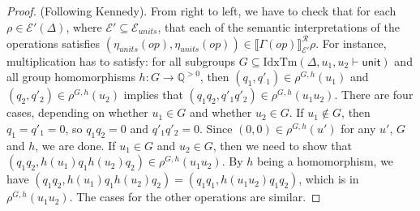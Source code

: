 \documentclass[natbib,preprint]{sigplanconf}
\newcommand{\idxTms}[2]{\mathrm{IdxTm}(#1 \vdash #2)}
\newcommand{\relEnv}[1]{\mathcal{#1}}
\newcommand{\rsem}[3]{\llbracket #1 \rrbracket^{\mathcal{R}}_{#2}{#3}}
\begin{document}
\begin{proof}
  (Following Kennedy).  From right to left, we have to check that for
  each $\rho \in \relEnv{E}'(\Delta)$, where $\relEnv{E}' \subseteq
  \relEnv{E}_{\mathit{units}}$, that each of the semantic
  interpretations of the operations satisfies
  $(\eta_{\mathit{units}}(\mathit{op}),
  \eta_{\mathit{units}}(\mathit{op})) \in
  \rsem{\Gamma(\mathit{op})}{\relEnv{E}'}\rho$. For instance,
  multiplication has to satisfy: for all subgroups $G \subseteq
  \idxTms{\Delta,u_1,u_2}{\mathsf{unit}}$ and all group homomorphisms
  $h : G \to \mathbb{Q}^{>0}$, then $(q_1,q'_1) \in \rho^{G,h}(u_1)$
  and $(q_2,q'_2) \in \rho^{G,h}(u_2)$ implies that $(q_1q_2,q'_1q'_2)
  \in \rho^{G,h}(u_1u_2)$. There are four cases, depending on whether
  $u_1 \in G$ and whether $u_2 \in G$. If $u_1 \not\in G$, then $q_1 =
  q'_1 = 0$, so $q_1q_2 = 0$ and $q'_1q'_2 = 0$. Since $(0,0) \in
  \rho^{G,h}(u')$ for any $u'$, $G$ and $h$, we are done. If $u_1 \in
  G$ and $u_2 \in G$, then we need to show that $(q_1q_2,
  h(u_1)q_1h(u_2)q_2) \in \rho^{G,h}(u_1u_2)$. By $h$ being a
  homomorphism, we have $(q_1q_2, h(u_1)q_1h(u_2)q_2) = (q_1q_1,
  h(u_1u_2)q_1q_2)$, which is in $\rho^{G,h}(u_1u_2)$. The cases for
  the other operations are similar.


\end{proof}
\end{document}
